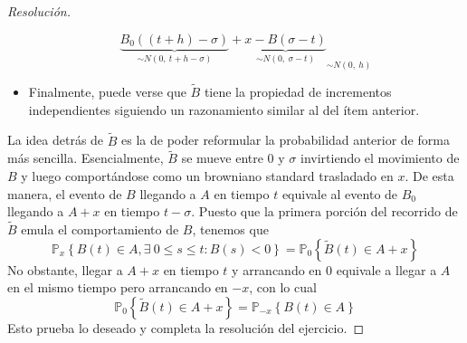 \documentclass[a4paper,11pt]{article}
\newcommand{\Probx}[2]{\ensuremath{\mathbb{P}_{#1} \left\{ #2 \right\}}}
\begin{document}
\begin{proof}[Resoluci\'on]
\begin{itemize}
$${            \underbrace{B_0((t+h) - \sigma)}_{\sim N(0,~t+h-\sigma)} 
            + \underbrace{x - B(\sigma - t)}_{\sim N(0,~\sigma - t)}}_{\sim N(0,~h)}$$
    \item Finalmente, puede verse que $\tilde{B}$ tiene la propiedad de incrementos independientes siguiendo
    un razonamiento similar al del ítem anterior.
\end{itemize}
La idea detrás de $\tilde{B}$ es la de poder reformular la probabilidad anterior de forma más sencilla. 
Esencialmente, $\tilde{B}$ se mueve entre $0$ y $\sigma$ invirtiendo el movimiento de $B$ y luego
comportándose como un browniano standard trasladado en $x$. De esta manera, el evento de $B$ llegando a $A$
en tiempo $t$ equivale al evento de $B_0$ llegando a $A + x$ en tiempo $t - \sigma$. Puesto que la primera
porción del recorrido de $\tilde{B}$ emula el comportamiento de $B$, tenemos que
$$\Probx{x}{B(t) \in A, \exists~0 \leq s \leq t : B(s) < 0} = \Probx{0}{\tilde{B}(t) \in A + x}$$
No obstante, llegar a $A+x$ en tiempo $t$ y arrancando en $0$ equivale a llegar a $A$ en el mismo tiempo
pero arrancando en $-x$, con lo cual
$$\Probx{0}{\tilde{B}(t) \in A + x} = \Probx{-x}{B(t) \in A}$$
Esto prueba lo deseado y completa la resolución del ejercicio.

\end{proof}
\end{document}
